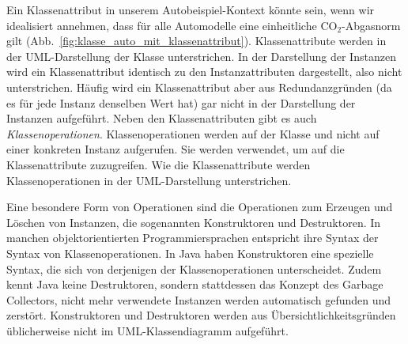 Ein Klassenattribut in unserem Autobeispiel-Kontext könnte  sein, wenn wir idealisiert annehmen, dass für alle Automodelle eine einheitliche $\text{CO}_2$-Abgasnorm gilt (Abb.~\ref{fig:klasse_auto_mit_klassenattribut}). Klassenattribute werden in der UML-Darstellung der Klasse unter\-strichen. In der Darstellung der Instanzen wird ein Klassenattribut identisch zu den Instanzattributen dargestellt, also nicht unterstrichen. Häufig wird ein Klassen\-attribut aber aus Redundanzgründen (da es für jede Instanz denselben Wert hat) gar nicht in der Darstellung der Instanzen aufgeführt. Neben den Klassen\-attributen gibt es auch \textit{Klassenoperationen}. Klassenoperationen werden auf der Klasse und nicht auf einer konkreten Instanz aufgerufen. Sie werden verwendet, um auf die Klassenattribute zuzugreifen. Wie die Klassenattribute werden Klassenoperationen in der UML-Darstellung unterstrichen.

\vspace{2mm} %

Eine 
besondere Form von Operationen sind die Operationen zum Erzeugen und Löschen von Instanzen, die sogenannten Konstruktoren und Destruktoren. In manchen objektorientierten Programmiersprachen entspricht ihre Syntax der Syntax von Klassenoperationen. In Java haben Konstruktoren eine spezielle Syntax, die sich von derjenigen der Klassenoperationen unterscheidet. Zudem kennt Java keine Destruktoren, sondern stattdessen das Konzept des Garbage Collectors, nicht mehr verwendete Instanzen werden automatisch gefunden und zerstört. Konstruktoren und Destruktoren werden aus Übersichtlichkeitsgründen üblicherweise nicht im UML-Klassendiagramm aufgeführt.